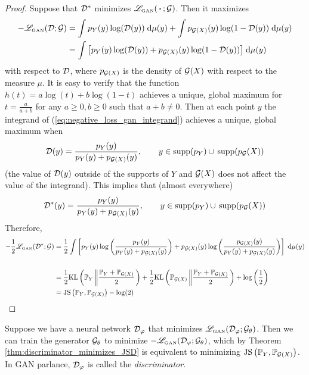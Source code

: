 \documentclass{article}
\newcommand{\dee}{\;\mathrm{d}}
\begin{document}
	\begin{proof}
		Suppose that \(\mathcal{D}^*\) minimizes \(\mathscr{L}_{\textnormal{\tiny GAN}}(\,\boldsymbol{\cdot}\,; \mathcal{G})\). Then it maximizes
		\begin{align}
			 -\lossgan(\discriminator; \generator) &= \int p_Y(y) \log(\discriminator(y)) \dee \mu(y) + \int p_{\generator(X)}(y) \log(1 - \discriminator(y)) \dee\mu(y) \\
			 \label{eq:negative_loss_gan_integrand}
			 &= \int \big[p_Y(y)\log(\discriminator(y)) + p_{\generator(X)}(y)\log(1-\discriminator(y))\big] \dee \mu(y) 
		\end{align}
		with respect to \(\mathcal{D}\), where \(p_{\mathcal{G}(X)}\) is the density of \(\mathcal{G}(X)\) with respect to the measure \(\mu\). It is easy to verify that the function \(h(t) = a\log(t) + b \log(1-t)\) achieves a unique, global maximum for \(t = \frac{a}{a + b}\) for any \(a \ge 0, b \ge 0\) such that \(a + b \ne 0\). Then at each point \(y\) the integrand of (\ref{eq:negative_loss_gan_integrand}) achieves a unique, global maximum when
		\begin{equation*}
			\mathcal{D}(y) = \frac{p_Y(y)}{p_Y(y) + p_{\mathcal{G}(X)}(y)}, \qquad y \in \mathrm{supp}(p_Y) \cup \,\mathrm{supp}(p_{\mathcal{G}}(X))
		\end{equation*}
		(the value of \(\mathcal{D}(y)\) outside of the supports of \(Y\) and \(\mathcal{G}(X)\) does not affect the value of the integrand). This implies that (almost everywhere)
		\begin{equation*}
			\mathcal{D}^*(y) = \frac{p_Y(y)}{p_Y(y) + p_{\mathcal{G}(X)}(y)}, \qquad y \in \mathrm{supp}(p_Y) \cup \,\mathrm{supp}(p_{\mathcal{G}}(X))
		\end{equation*}
		Therefore,
		\begin{align*}
			-\frac{1}{2}\lossgan(\discriminator^*; \generator) &= \frac{1}{2}\int \left[p_Y(y) \log\left(\frac{p_Y(y)}{p_Y(y) + p_{\generator(X)}(y)}\right) + p_{\generator(X)}(y)\log\left(\frac{p_{\generator(X)}(y)}{p_Y(y) + p_{\generator(X)}(y)}\right)\right]\dee\mu(y)\\\\
			&= \frac{1}{2}\kld\left(\prob_Y \left\Vert \frac{\prob_Y + \prob_{\generator(X)}}{2}\right.\right) + \frac{1}{2}\kld\left(\prob_{\generator(X)} \left\Vert \frac{\prob_Y+ \prob_{\generator(X)}}{2} \right.\right) + \log\left(\frac{1}{2}\right) \\
			&= \jsd\left(\prob_Y, \prob_{\generator(X)}\right) - \log(2)
		\end{align*}
	\end{proof}
	Suppose we have a neural network \(\mathcal{D}_\varphi\) that minimizes \(\mathscr{L}_{\textnormal{\tiny GAN}}(\mathcal{D}_\varphi; \mathcal{G}_\theta)\). Then we can train the generator \(\mathcal{G}_\theta\) to minimize \(-\mathscr{L}_{\textnormal{\tiny GAN}}(\mathcal{D}_\varphi; \mathcal{G}_{\theta})\), which by Theorem \ref{thm:discriminator_minimizes_JSD} is equivalent to minimizing \(\mathrm{JS}\left(\mathbb{P}_Y, \mathbb{P}_{\mathcal{G}(X)}\right)\). In GAN parlance, \(\mathcal{D}_\varphi\) is called the \textit{discriminator}.
	
\end{document}
